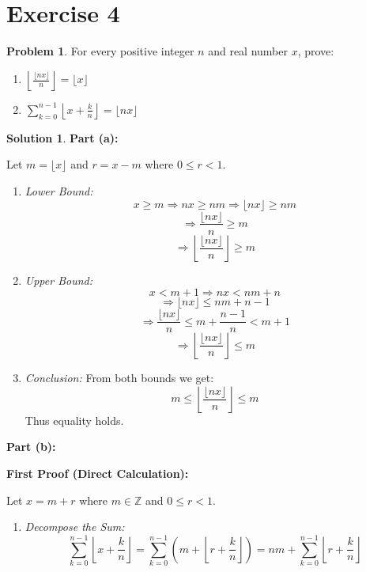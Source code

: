 \documentclass{article}
\theoremstyle{definition}
\newtheorem{problem}{Problem}
\newtheorem*{solution}{Solution}
\begin{document}
\section*{Exercise 4}

\begin{problem}
For every positive integer \( n \) and real number \( x \), prove:
\begin{enumerate}[label=(\alph*)]
    \item \( \left\lfloor \frac{\lfloor nx \rfloor}{n} \right\rfloor = \lfloor x \rfloor \)
    \item \( \sum_{k=0}^{n-1} \left\lfloor x + \frac{k}{n} \right\rfloor = \lfloor nx \rfloor \)
\end{enumerate}
\end{problem}

\begin{solution}

\textbf{Part (a):}

Let \( m = \lfloor x \rfloor \) and \( r = x - m \) where \( 0 \leq r < 1 \).

\begin{enumerate}
\item \textit{Lower Bound:}
\[ x \geq m \Rightarrow nx \geq nm \Rightarrow \lfloor nx \rfloor \geq nm \]
\[ \Rightarrow \frac{\lfloor nx \rfloor}{n} \geq m \]
\[ \Rightarrow \left\lfloor \frac{\lfloor nx \rfloor}{n} \right\rfloor \geq m \]

\item \textit{Upper Bound:}
\[ x < m + 1 \Rightarrow nx < nm + n \]
\[ \Rightarrow \lfloor nx \rfloor \leq nm + n - 1 \]
\[ \Rightarrow \frac{\lfloor nx \rfloor}{n} \leq m + \frac{n-1}{n} < m + 1 \]
\[ \Rightarrow \left\lfloor \frac{\lfloor nx \rfloor}{n} \right\rfloor \leq m \]

\item \textit{Conclusion:}
From both bounds we get:
\[ m \leq \left\lfloor \frac{\lfloor nx \rfloor}{n} \right\rfloor \leq m \]
Thus equality holds.
\end{enumerate}

\textbf{Part (b):}

\textbf{First Proof (Direct Calculation):}

Let \( x = m + r \) where \( m \in \mathbb{Z} \) and \( 0 \leq r < 1 \).

\begin{enumerate}
\item \textit{Decompose the Sum:}
\[ \sum_{k=0}^{n-1} \left\lfloor x + \frac{k}{n} \right\rfloor = \sum_{k=0}^{n-1} \left( m + \left\lfloor r + \frac{k}{n} \right\rfloor \right) = nm + \sum_{k=0}^{n-1} \left\lfloor r + \frac{k}{n} \right\rfloor \]


\end{enumerate}
\end{solution}
\end{document}
